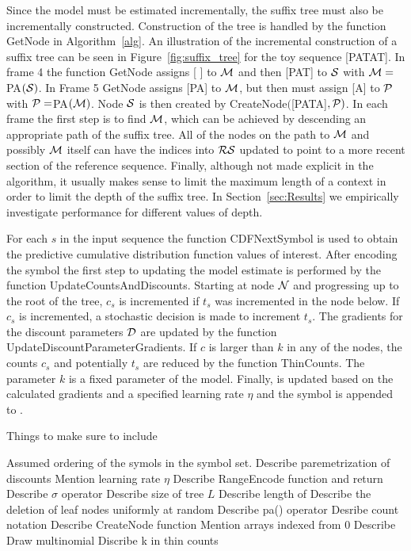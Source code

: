Since the model must be estimated incrementally, the suffix tree must also be incrementally constructed.  Construction of the tree is handled by the function GetNode in Algorithm~\ref{alg}.  An illustration of the incremental construction of a suffix tree can be seen in Figure~\ref{fig:suffix_tree} for the toy sequence [PATAT].   In frame 4 the function GetNode assigns [ ]  to $\M$ and then [PAT] to $\Seq$ with $\M = $ PA$(\Seq)$. In Frame 5 GetNode assigns [PA] to $\M$, but then must assign [A] to $\PP$ with $\PP = $PA$(\M)$.  Node $\Seq$ is then created by CreateNode$($[PATA]$,\PP)$.  In each frame the first step is to find $\M$, which can be achieved by descending an appropriate path of the suffix tree.  All of the nodes on the path to $\M$ and possibly $\M$ itself can have the indices into $\RS$ updated to point to a more recent section of the reference sequence.  Finally, although not made explicit in the algorithm, it usually makes sense to limit the maximum length of a context in order to limit the depth of the suffix tree.  In Section~\ref{sec:Results} we empirically investigate performance for different values of depth.

For each $s$ in the input sequence the function CDFNextSymbol is used to obtain the predictive cumulative distribution function values of interest.  After encoding the symbol the first step to updating the model estimate is performed by the function UpdateCountsAndDiscounts.  Starting at node $\N$ and progressing up to the root of the tree, $c_s$ is incremented if $t_s$ was incremented in the node below.  If $c_s$ is incremented, a stochastic decision is made to increment $t_s$.  The gradients for the discount parameters $\D$ are updated by the function UpdateDiscountParameterGradients.  If $c$ is larger than $k$ in any of the nodes, the counts $c_s$ and potentially $t_s$ are reduced by the function ThinCounts.  The parameter $k$ is a fixed parameter of the model.  Finally, \D \space is updated based on the calculated gradients and a specified learning rate $\eta$ and the symbol is appended to \RS.


Things to make sure to include

Assumed ordering of the symols in the symbol set.
Describe paremetrization of discounts
Mention learning rate $\eta$
Describe RangeEncode function and return
Describe $\sigma$ operator
Describe size of tree $L$
Describe length of \RS \space 
Describe the deletion of leaf nodes uniformly at random
Describe pa(\N) operator
Desribe count notation
Describe CreateNode function
Mention arrays indexed from 0
Describe Draw multinomial
Discribe k in thin counts

